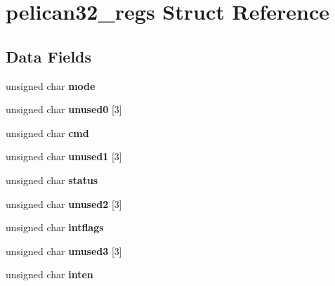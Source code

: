 \hypertarget{structpelican32__regs}{}\section{pelican32\+\_\+regs Struct Reference}
\label{structpelican32__regs}
\subsection*{Data Fields}
\begin{DoxyCompactItemize}
\item 
\mbox{\label{structpelican32__regs_a877c3639d8c3046f29e54422d6ff179e}} 
unsigned char {\bfseries mode}
\item 
\mbox{\label{structpelican32__regs_abba0d39684bd55be1c1d00260ea7028e}} 
unsigned char {\bfseries unused0} \mbox{[}3\mbox{]}
\item 
\mbox{\label{structpelican32__regs_ad3a1091b72dde290d40f17de7982d406}} 
unsigned char {\bfseries cmd}
\item 
\mbox{\label{structpelican32__regs_ab027987829e28bc02c9d3584b61e7f09}} 
unsigned char {\bfseries unused1} \mbox{[}3\mbox{]}
\item 
\mbox{\label{structpelican32__regs_afd07625afc565d51cf9e62d451fccdc9}} 
unsigned char {\bfseries status}
\item 
\mbox{\label{structpelican32__regs_a547a9a13d1b11f47e74137b4b18c9311}} 
unsigned char {\bfseries unused2} \mbox{[}3\mbox{]}
\item 
\mbox{\label{structpelican32__regs_a684ba4b3c0336367eb023671b71c5ca9}} 
unsigned char {\bfseries intflags}
\item 
\mbox{\label{structpelican32__regs_a623412a6e3d3cbcfc060a137e2a88758}} 
unsigned char {\bfseries unused3} \mbox{[}3\mbox{]}
\item 
\mbox{\label{structpelican32__regs_aeaec953eed9158ca815915730c960607}} 
unsigned char {\bfseries inten}

\end{DoxyCompactItemize}
